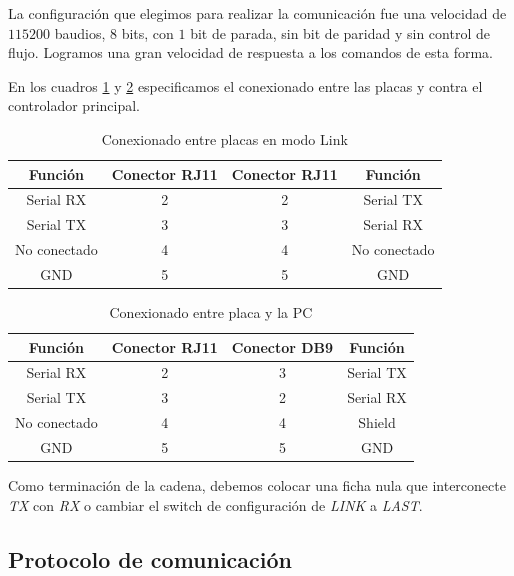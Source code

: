 La configuraci\'on que elegimos para realizar la comunicaci\'on fue una velocidad de $115200$ baudios, $8$ bits, con $1$
bit de parada, sin bit de paridad y sin control de flujo.
Logramos una gran velocidad de respuesta a los comandos de esta forma.

En los cuadros \ref{hT_comm_conexionLink} y \ref{hT_comm_conexionRS232} especificamos el conexionado entre las placas
y contra el controlador principal.

\begin{table}[ht]
	\begin{center}
		\begin{tabular}{|c|c|c|c|}
			\hline
			Funci\'on & Conector RJ11 & Conector RJ11 & Funci\'on\\
			\hline
			Serial RX & 2 & 2 & Serial TX \\
			\hline
			Serial TX & 3 & 3 & Serial RX \\
			\hline
			No conectado & 4 & 4 & No conectado \\
			\hline
			GND & 5 & 5 &  GND\\
			\hline
		\end{tabular}
		\caption{Conexionado entre placas en modo Link}
		\label{hT_comm_conexionLink}
	\end{center}
\end{table}

\begin{table}[ht]
	\begin{center}
		\begin{tabular}{|c|c|c|c|}
			\hline
			Funci\'on & Conector RJ11 & Conector DB9 & Funci\'on\\
			\hline
			Serial RX & 2 & 3 & Serial TX \\
			\hline
			Serial TX & 3 & 2 & Serial RX \\
			\hline
			No conectado & 4 & 4 & Shield \\
			\hline
			GND & 5 & 5 &  GND\\
			\hline
		\end{tabular}
		\caption{Conexionado entre placa y la PC}
		\label{hT_comm_conexionRS232}
	\end{center}
\end{table}

Como terminaci\'on de la cadena, debemos colocar una ficha nula que interconecte \emph{TX} con \emph{RX} o
cambiar el switch de configuraci\'on de \emph{LINK} a \emph{LAST}.

\subsection{Protocolo de comunicaci\'on}
\label{h_comm_protocolo}

